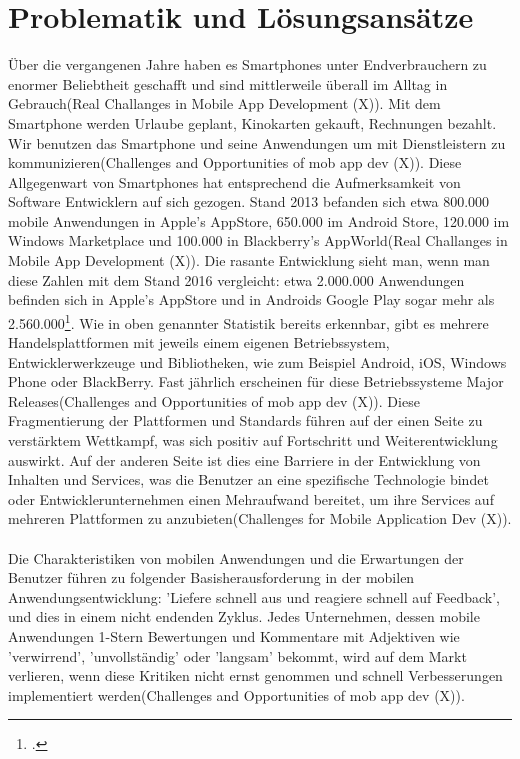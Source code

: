 \chapter{Problematik und Lösungsansätze}

Über die vergangenen Jahre haben es Smartphones unter Endverbrauchern zu enormer Beliebtheit geschafft und sind mittlerweile überall im Alltag in Gebrauch(Real Challanges in Mobile App Development (X)). Mit dem Smartphone werden Urlaube geplant, Kinokarten gekauft, Rechnungen bezahlt. Wir benutzen das Smartphone und seine Anwendungen um mit Dienstleistern zu kommunizieren(Challenges and Opportunities of mob app dev (X)). Diese Allgegenwart von Smartphones hat entsprechend die Aufmerksamkeit von Software Entwicklern auf sich gezogen. Stand 2013 befanden sich etwa 800.000 mobile Anwendungen in Apple's AppStore, 650.000 im Android Store, 120.000 im Windows Marketplace und 100.000 in Blackberry's AppWorld(Real Challanges in Mobile App Development (X)). Die rasante Entwicklung sieht man, wenn man diese Zahlen mit dem Stand 2016 vergleicht: etwa 2.000.000 Anwendungen befinden sich in Apple's AppStore und in Androids Google Play sogar mehr als 2.560.000\footcite{StatistikApps}. Wie in oben genannter Statistik bereits erkennbar, gibt es mehrere Handelsplattformen mit jeweils einem eigenen Betriebssystem, Entwicklerwerkzeuge und Bibliotheken, wie zum Beispiel Android, iOS, Windows Phone oder BlackBerry. Fast jährlich erscheinen für diese Betriebssysteme Major Releases(Challenges and Opportunities of mob app dev (X)). Diese Fragmentierung der Plattformen und Standards führen auf der einen Seite zu verstärktem Wettkampf, was sich positiv auf Fortschritt und Weiterentwicklung auswirkt. Auf der anderen Seite ist dies eine Barriere in der Entwicklung von Inhalten und Services, was die Benutzer an eine spezifische Technologie bindet oder Entwicklerunternehmen einen Mehraufwand bereitet, um ihre Services auf mehreren Plattformen zu anzubieten(Challenges for Mobile Application Dev (X)). 
\\
\\
Die Charakteristiken von mobilen Anwendungen und die Erwartungen der Benutzer führen zu folgender Basisherausforderung in der mobilen Anwendungsentwicklung: 'Liefere schnell aus und reagiere schnell auf Feedback', und dies in einem nicht endenden Zyklus. Jedes Unternehmen, dessen mobile Anwendungen 1-Stern Bewertungen und Kommentare mit Adjektiven  wie 'verwirrend', 'unvollständig' oder 'langsam' bekommt, wird auf dem Markt verlieren, wenn diese Kritiken nicht ernst genommen und schnell Verbesserungen implementiert werden(Challenges and Opportunities of mob app dev (X)). 
